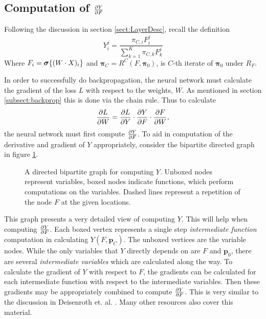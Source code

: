 \subsection{Computation of \( \pdv{Y}{F} \)}\label{subsect:ComputationGraph}
Following the discussion in section \ref{sect:LayerDesc}, recall the definition
\[Y_i^j = \dfrac{{\pi}_{C,i} F_i^j}{\sum_{k=1}^{K} \pi_{C,k} F_k^j}\]
Where $F_i = \bm{\sigma}\{(W\cdot X)_i\}$ and $\bm\pi_C=R^C(F,\bm \pi_0)$, 
is \( C \)-th iterate of \( \bm\pi_0 \) under $R_F$.

In order to successfully do backpropagation, the neural network must calculate the gradient 
of the loss \( L \) with respect to the weights, \(W\). As mentioned in section \ref{subsect:backprop} this is done via the chain rule.  Thus to calculate
\begin{equation}\label{eqn:LossGrad}
	\pdv{L}{W} = \pdv{L}{Y}\cdot\pdv{Y}{F}\cdot\pdv{F}{W},
\end{equation}
the neural network must first compute \( \pdv{Y}{F} \). To aid in computation of the derivative and gradient of \( Y \) appropriately, consider the bipartite directed graph in figure \ref{fig:layerDependencies}.

\begin{figure}[h!]
	\centering
  	
	\caption[Computation Graph for \( Y \)]{A directed bipartite graph for computing \( Y \). Unboxed nodes represent variables, boxed nodes indicate functions, which perform computations on the variables. Dashed lines represent a repetition of the node $F$ at the given locations.}
	\label{fig:layerDependencies}
\end{figure}

This graph presents a very detailed view of computing \( Y \). This will help when computing \( \pdv{Y}{F} \).  Each boxed vertex represents a single step \textit{intermediate function} computation in calculating \( Y(F,\bm p_C) \).  The unboxed vertices are the variable nodes. While the only variables that \( Y \) directly depends on are \( F \) and \( \bm p_0 \), there are several \textit{intermediate variables} which are calculated along the way.  To calculate the gradient of \( Y \) with respect to \( F \), the gradients can be calculated for each intermediate function with respect to the intermediate variables. Then these gradients may be appropriately combined to compute \( \pdv{Y}{F} \).  This is very similar to the discussion in Deisenroth et. al. \cite[example 5.14]{MML_2019}.  Many other resources also cover this material.

